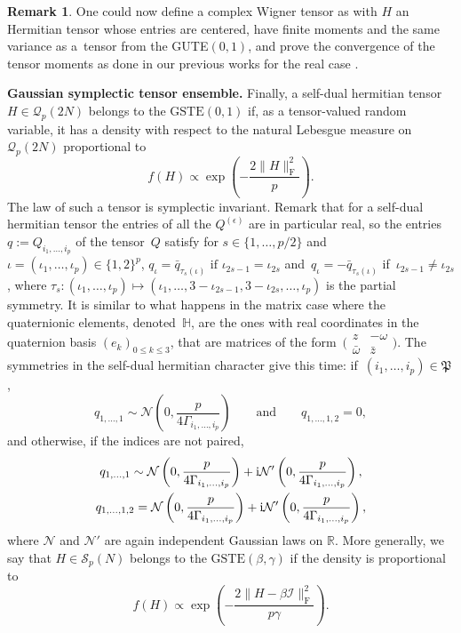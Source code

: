 \documentclass[pdftex]{sigma}
\newcommand{\AND}{\qquad \mathrm{and} \qquad}
\numberwithin{equation}{section}
\theoremstyle{definition}
\newtheorem{Remark}[Theorem]{Remark}
\begin{document}
\begin{Remark}
    One could now define a complex Wigner tensor as  with $H$ an Hermitian tensor whose entries are centered, have finite moments and the same variance as a~tensor from the GUTE$(0,1)$, and prove the convergence of the tensor moments as done in our previous works for the real case \cite{bonnin2025tensorialfreeconvolutionsemicircular,bonnin2024universalitywignerguraulimitrandom}.
\end{Remark}

{\bf Gaussian symplectic tensor ensemble.}
Finally, a self-dual hermitian tensor $H \in \mathcal{Q}_p(2N)$ belongs to the $\textrm{GSTE}(0,1)$ if, as a tensor-valued random variable, it has a density with respect to the natural Lebesgue measure on $\mathcal{Q}_p(2N)$ proportional to
\[f(H) \propto \exp{\left(-\frac{2 \| H \| _{\mathrm{F}}^2}{p}\right)}.\]
The law of such a tensor is symplectic invariant. Remark that for a self-dual hermitian tensor the entries of all the $Q^{(\epsilon)}$ are in particular real, so the entries $q:=Q_{i_1,\dots,i_p}$ of the tensor~$Q$ satisfy for $s\in \{1,\dots,p/2\}$ and~${\iota=(\iota_1,\dots,\iota_p) \in \{1,2\}^p}$,
$q_{\iota} = \bar q_{\tau_s(\iota)} \text{ if } \iota_{2s-1} = \iota_{2s}$ and~${q_{\iota} = -\bar q_{\tau_s(\iota)}}$ if~${\iota_{2s-1} \neq \iota_{2s}}$,
where $\tau_s\colon (\iota_1,\dots,\iota_p) \mapsto (\iota_1,\dots,3-\iota_{2s-1},3-\iota_{2s},\dots,\iota_p)$ is the partial symmetry. It is similar to what happens in the matrix case where the quaternionic elements, denoted~$\mathbb{H}$, are the ones with real coordinates in the quaternion basis $(e_k)_{0\leq k\leq 3}$, that are matrices of the form~${\bigl(\begin{smallmatrix} z & -\omega \\ \bar \omega & \bar z \end{smallmatrix}\bigr)}$.
The symmetries in the self-dual hermitian character give this time: if~${(i_1,\dots,i_p) \in \mathfrak{P}}$,
\[ q_{1,\dots,1} \sim \mathcal{N}\left(0,\frac{p}{4 \Gamma_{i_1,\dots,i_{p}} }\right) \AND q_{1,\dots,1,2}=0, \]
and otherwise, if the indices are not paired,
\begin{gather*}
 q_{1,\dots,1} \sim \mathcal{N}\left(0,\frac{p}{4 \Gamma_{i_1,\dots,i_{p}} }\right) +{\rm i} \mathcal{N}'\left(0,\frac{p}{4 \Gamma_{i_1,\dots,i_{p}} }\right),  \\ q_{1,\dots,1,2}=\mathcal{N}\left(0,\frac{p}{4 \Gamma_{i_1,\dots,i_{p}} }\right) +{\rm i} \mathcal{N}'\left(0,\frac{p}{4 \Gamma_{i_1,\dots,i_{p}} }\right) ,
 \end{gather*}
where $\mathcal{N}$ and $\mathcal{N}'$ are again independent Gaussian laws on $\mathbb{R}$. More generally, we say that $H \in \mathcal{S}_p(N)$ belongs to the $\textrm{GSTE}(\beta,\gamma)$ if the density is proportional to
\[f(H) \propto \exp{\left(-\frac{2 \| H - \beta \mathcal{I} \| _{\mathrm{F}}^2}{p \gamma}\right)}.\]
\end{document}

